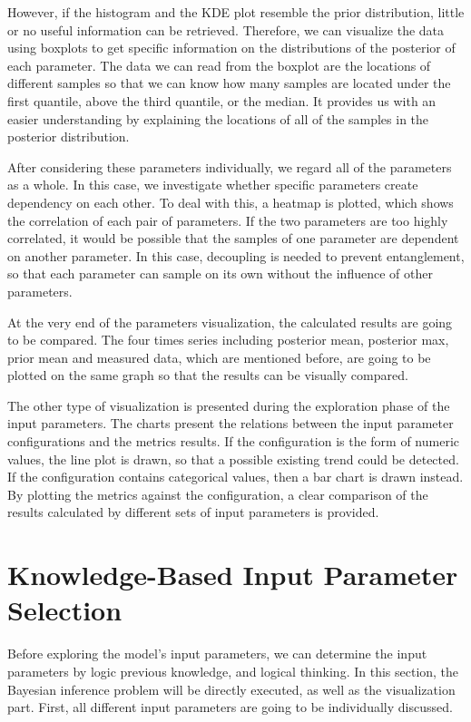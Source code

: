 However, if the histogram and the KDE plot resemble the prior distribution, little or no useful information can be retrieved. Therefore, we can visualize the data using boxplots to get specific information on the distributions of the posterior of each parameter. The data we can read from the boxplot are the locations of different samples so that we can know how many samples are located under the first quantile, above the third quantile, or the median. It provides us with an easier understanding by explaining the locations of all of the samples in the posterior distribution.

After considering these parameters individually, we regard all of the parameters as a whole. In this case, we investigate whether specific parameters create dependency on each other. To deal with this, a heatmap is plotted, which shows the correlation of each pair of parameters. If the two parameters are too highly correlated, it would be possible that the samples of one parameter are dependent on another parameter. In this case, decoupling is needed to prevent entanglement, so that each parameter can sample on its own without the influence of other parameters.

At the very end of the parameters visualization, the calculated results are going to be compared. The four times series including posterior mean, posterior max, prior mean and measured data, which are mentioned before, are going to be plotted on the same graph so that the results can be visually compared.

The other type of visualization is presented during the exploration phase of the input parameters. The charts present the relations between the input parameter configurations and the metrics results. If the configuration is the form of numeric values, the line plot is drawn, so that a possible existing trend could be detected. If the configuration contains categorical values, then a bar chart is drawn instead. By plotting the metrics against the configuration, a clear comparison of the results calculated by different sets of input parameters is provided.

\section{Knowledge-Based Input Parameter Selection}

Before exploring the model's input parameters, we can determine the input parameters by logic previous knowledge, and logical thinking. In this section, the Bayesian inference problem will be directly executed, as well as the visualization part. First, all different input parameters are going to be individually discussed.


